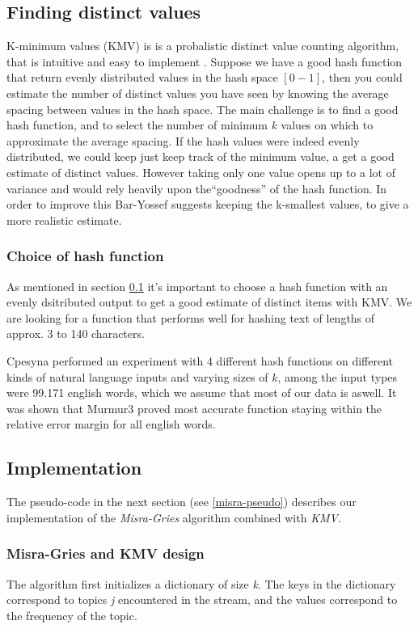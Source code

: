 

\subsection{Finding distinct values}\label{algo-distinct}
K-minimum values (KMV) is is a probalistic distinct value counting algorithm, that is intuitive and easy to implement \cite{kmv}. Suppose we have a good hash function that return evenly distributed values in the hash space $[0-1]$, then you could estimate the number of distinct values you have seen by knowing the average spacing between values in the hash space. The main challenge is to find a good hash function, and to select the number of minimum $k$ values on which to approximate the average spacing. If the hash values were indeed evenly distributed, we could keep just keep track of the minimum value, a get a good estimate of distinct values. However taking only one value opens up to a lot of variance and would rely heavily upon the``goodness'' of the hash function. In order to improve this Bar-Yossef\cite{Bar-Yossef} suggests keeping the k-smallest values, to give a more realistic estimate.

\subsubsection{Choice of hash function}\label{hash-function}
As mentioned in section \ref{algo-distinct} it's important to choose a hash function with an evenly dsitributed output to get a good estimate of distinct items with KMV. We are looking for a function that performs well for hashing text of lengths of approx. 3 to 140 characters. 

Cpesyna \cite{KMV1} performed an experiment with 4 different hash functions on different kinds of natural language inputs and varying sizes of $k$, among the input types were 99.171 english words, which we assume that most of our data is aswell. It was shown that Murmur3 proved most accurate function staying within the relative error margin for all english words.

\subsection{Implementation}\label{algo-data}
The pseudo-code in the next section (see \ref{misra-pseudo}) describes our implementation of the \textit{Misra-Gries} algorithm combined with \textit{KMV}.  

\subsubsection{Misra-Gries and KMV design}\label{misra-gries}
The algorithm first initializes a dictionary of size \textit{k}. The keys in the dictionary correspond to topics \textit{j} encountered in the stream, and the values correspond to the frequency  of the topic. 

